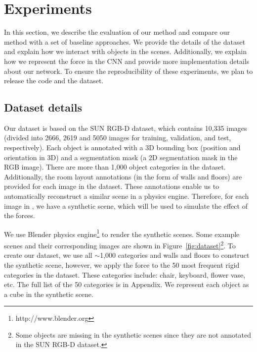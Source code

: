 \documentclass[runningheads]{llncs}
\begin{document}
\section{Experiments}

In this section, we describe the evaluation of our method and compare our method with a set of baseline approaches. We provide the details of the dataset and explain how we interact with objects in the scenes. Additionally, we explain how we represent the force in the CNN and provide more implementation details about our network. To ensure the reproducibility of these experiments, we plan to release the code and the dataset. 

\subsection{Dataset details}
\label{sec:subdataset}
Our dataset is based on the SUN RGB-D \cite{sunrgbd} dataset, which contains 10,335 images (divided into 2666, 2619 and 5050 images for training, validation, and test, respectively). Each object is annotated with a 3D bounding box (position and orientation in 3D) and a segmentation mask (a 2D segmentation mask in the RGB image). There are more than 1,000 object categories in the dataset. Additionally, the room layout annotations (in the form of walls and floors) are provided for each image in the dataset. These annotations enable us to automatically reconstruct a similar scene in a physics engine. Therefore, for each image in \cite{sunrgbd}, we have a synthetic scene, which will be used to simulate the effect of the forces.

We use Blender physics engine\footnote{http://www.blender.org} to render the synthetic scenes. Some example scenes and their corresponding images are shown in Figure~\ref{fig:dataset}\footnote{Some objects are missing in the synthetic scenes since they are not annotated in the SUN RGB-D dataset.}. To create our dataset, we use all $\sim$1,000 categories and walls and floors to construct the synthetic scene, however, we apply the force to the 50 most frequent rigid categories in the dataset. These categories include: chair, keyboard, flower vase, etc. The full list of the 50 categories is in Appendix. We represent each object as a cube in the synthetic scene. 
\end{document}
